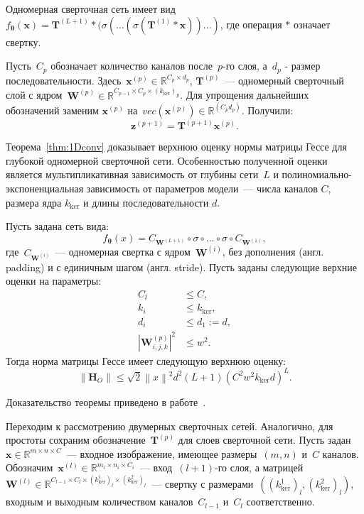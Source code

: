 Одномерная сверточная сеть имеет вид~$f_{\boldsymbol{\theta}}(\mathbf{x}) = \mathbf{T}^{(L+1)} * (\sigma(\dots (\sigma(\mathbf{T}^{(1)} * \mathbf{x}))\dots)$, где операция $*$ означает свертку.

Пусть~$C_p$ обозначает количество каналов после~$p$-го слоя, а~$d_p$ - размер последовательности. Здесь~$\mathbf{x}^{(p)} \in \mathbb{R}^{C_p \times d_p}$, $\mathbf{T}^{(p)}$~--- одномерный сверточный слой с ядром~$\mathbf{W}^{(p)} \in \mathbb{R}^{C_{p-1} \times C_{p} \times (k_{\mathrm{ker}})_p}$. 
Для упрощения дальнейших обозначений заменим $\mathbf{x}^{(p)}$ на~$vec(\mathbf{x}^{(p)}) \in \mathbb{R}^{(C_pd_p)}$. 
Получили:
\[
    \mathbf{z}^{(p+1)} = \mathbf{T}^{(p+1)}\mathbf{x}^{(p)}.
\]

Теорема~\ref{thm:1Dconv} доказывает верхнюю оценку нормы матрицы Гессе для глубокой одномерной сверточной сети. Особенностью полученной оценки является мультипликативная зависимость от глубины сети~$L$ и полиномиально-экспоненциальная зависимость от параметров модели~--- числа каналов $C$, размера ядра $k_{\mathrm{ker}}$ и длины последовательности $d$.

\begin{theorem}\label{thm:1Dconv}
    Пусть задана сеть вида:
    \[
        f_{\boldsymbol{\theta}}(x) = C_{\mathbf{W}^{(L+1)}} \circ \sigma \circ \dots \circ \sigma \circ C_{\mathbf{W}^{(1)}},
    \]
    где~$C_{\mathbf{W}^{(i)}}$~--- одномерная свертка с ядром~$\mathbf{W}^{(i)}$, без дополнения (англ. padding) и с единичным шагом (англ. stride). Пусть заданы следующие верхние оценки на параметры:
    \begin{align}
        C_l &\leqslant C,\\
        k_i &\leqslant k_{\mathrm{ker}},\\
        d_i &\leqslant d_1:=d,\\
        |\mathbf{W}^{(p)}_{i,j,k}|^2 &\leqslant w^2.
    \end{align}
    Тогда норма матрицы Гессе имеет следующую верхнюю оценку:
    \[
        \left\|\mathbf{H}_{O}\right\| \leqslant \sqrt{2}\left\|x\right\|^2d^2(L+1)(C^2w^2k_{\mathrm{ker}}d)^L.
    \]
\end{theorem}
Доказательство теоремы приведено в работе~\cite{grabovoi2024convnets743111032}.

Переходим к рассмотрению двумерных сверточных сетей.
Аналогично, для простоты сохраним обозначение~$\mathbf{T}^{(p)}$ для слоев сверточной сети.
Пусть задан~$\mathbf{x} \in \mathbb{R}^{m \times n \times C}$~--- входное изображение, имеющее размеры~$(m, n)$ и~$C$ каналов.
Обозначим~$\mathbf{x}^{(l)} \in \mathbb{R}^{m_i \times n_i \times C_i}$~--- вход~$(l+1)$-го слоя, а матрицей~$\mathbf{W}^{(l)} \in \mathbb{R}^{C_{l-1} \times C_l \times (k_{\mathrm{ker}}^1)_l \times (k_{\mathrm{ker}}^2)_l}$~--- свертку с размерами~$((k_{\mathrm{ker}}^1)_l, (k_{\mathrm{ker}}^2)_l)$, входным и выходным количеством каналов~$C_{l-1}$ и~$C_l$ соответственно.

